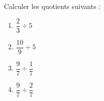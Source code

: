 
\begin{exercice}\label{exo2smath-0030}

    Calculer les quotients suivants :
    \begin{multicols}{2}
        \begin{enumerate}
            \item
                \( \dfrac{ 2 }{ 3 }\div 5\)
            \item
                \( \dfrac{ 10 }{ 9 }\div 5\)
            \item
                \( \dfrac{ 9 }{ 7 }\div\dfrac{ 1 }{ 7 }\)
            \item
                \( \dfrac{ 9 }{ 7 }\div\dfrac{ 2 }{ 7 }\)
        \end{enumerate}
    \end{multicols}

\end{exercice}
